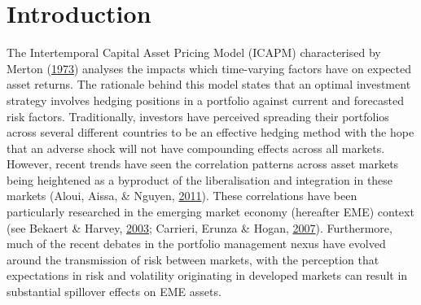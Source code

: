 \documentclass[11pt,preprint, authoryear]{elsarticle}
\numberwithin{equation}{section}
\numberwithin{figure}{section}
\numberwithin{table}{section}
\begin{document}
\pagestyle{fancy}
\chead{}
\rhead{}
\lfoot{}
\lhead{}
\cfoot{}


\headsep 35pt %




\hypertarget{introduction}{%
\section{\texorpdfstring{Introduction
\label{Introduction}}{Introduction }}\label{introduction}}

The Intertemporal Capital Asset Pricing Model (ICAPM) characterised by
Merton (\protect\hyperlink{ref-merton1973intertemporal}{1973}) analyses
the impacts which time-varying factors have on expected asset returns.
The rationale behind this model states that an optimal investment
strategy involves hedging positions in a portfolio against current and
forecasted risk factors. Traditionally, investors have perceived
spreading their portfolios across several different countries to be an
effective hedging method with the hope that an adverse shock will not
have compounding effects across all markets. However, recent trends have
seen the correlation patterns across asset markets being heightened
as a byproduct of the liberalisation and integration in these markets
(Aloui, Aissa, \& Nguyen,
\protect\hyperlink{ref-aloui2011global}{2011}). These correlations have
been particularly researched in the emerging market economy (hereafter
EME) context (see Bekaert \& Harvey,
\protect\hyperlink{ref-bekaert2003market}{2003}; Carrieri, Erunza \& Hogan,
\protect\hyperlink{ref-carrieri2007characterizing}{2007}). Furthermore, much of the recent debates in
the portfolio management nexus have evolved around the transmission of
risk between markets, with the perception that expectations in risk and
volatility originating in developed markets can result in substantial
spillover effects on EME assets.
\end{document}

